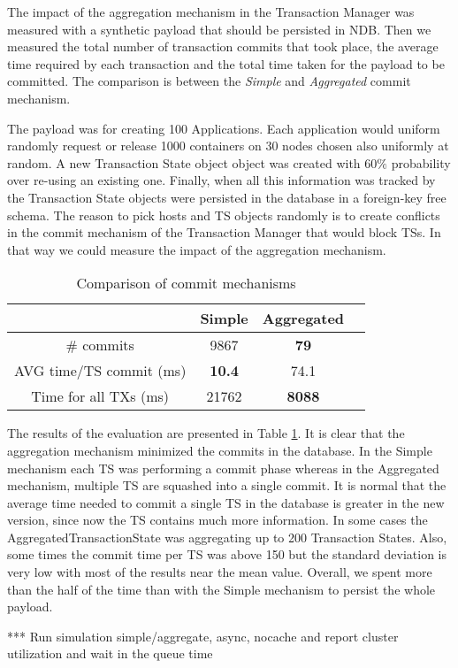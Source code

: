 The impact of the aggregation mechanism in the Transaction Manager was
measured with a synthetic payload that should be persisted in
NDB. Then we measured the total number of transaction commits that
took place, the average time required by each transaction and the
total time taken for the payload to be committed. The comparison is
between the \emph{Simple} and \emph{Aggregated} commit mechanism.

The payload was for creating 100 Applications. Each application would
uniform randomly request or release 1000 containers on 30 nodes
chosen also uniformly at random. A new Transaction State object object
was created with 60$\%$ probability over re-using an existing
one. Finally, when all this information was tracked by the Transaction
State objects were persisted in the database in a foreign-key free
schema. The reason to pick hosts
and TS objects randomly is to create conflicts in the commit mechanism
of the Transaction Manager that would block TSs. In that way we could
measure the impact of the aggregation mechanism.

\begin{table}
\centering
\begin{tabular}{| c | c | c | c |}
\hline
  & Simple & Aggregated \\
\hline
\# commits & 9867 & \textbf{79} \\
\hline
AVG time/TS commit (ms) & \textbf{10.4} & 74.1 \\
\hline
Time for all TXs (ms) & 21762 & \textbf{8088} \\
\hline
\end{tabular}
\caption{Comparison of commit mechanisms}
\label{tab:ev_commit_mechanism}
\end{table}

The results of the evaluation are presented in Table
\ref{tab:ev_commit_mechanism}. It is clear that the aggregation
mechanism minimized the commits in the database. In the Simple mechanism
each TS was performing a commit phase whereas in the Aggregated mechanism,
multiple TS are squashed into a single commit. It is normal that the
average time needed to commit a single TS in the database is greater
in the new version, since now the TS contains much more
information. In some cases the AggregatedTransactionState was
aggregating up to 200 Transaction States. Also, some times the commit
time per TS was above 150 but the standard deviation is very low with
most of the results near the mean value. Overall, we spent more
than the half of the time than with the Simple mechanism to persist
the whole payload.

*** Run simulation simple/aggregate, async, nocache and report cluster
utilization and wait in the queue time